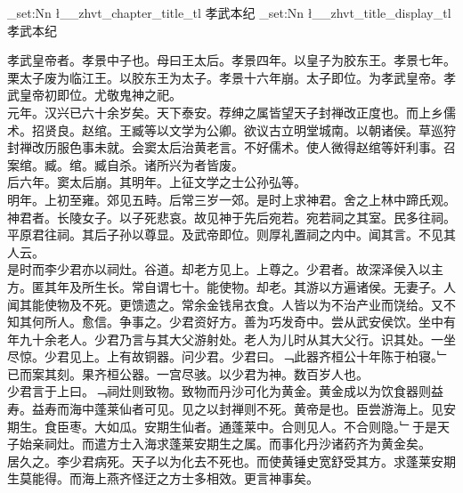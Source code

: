 \documentclass{zhvt-classic}
\begin{document}
\clearpage
\ExplSyntaxOn
\tl_set:Nn \l__zhvt_chapter_title_tl { 孝武本纪 }
\tl_set:Nn \l__zhvt_title_display_tl { 孝武本纪 }
\ExplSyntaxOff
\maketitle


\hspace*{2em}孝武皇帝者。孝景中子也。母曰王太后。孝景四年。以皇子为胶东王。孝景七年。栗太子废为临江王。以胶东王为太子。孝景十六年崩。太子即位。为孝武皇帝。孝武皇帝初即位。尤敬鬼神之祀。\\
\hspace*{2em}元年。汉兴已六十余岁矣。天下泰安。荐绅之属皆望天子封禅改正度也。而上乡儒术。招贤良。赵绾。王臧等以文学为公卿。欲议古立明堂城南。以朝诸侯。草巡狩封禅改历服色事未就。会窦太后治黄老言。不好儒术。使人微得赵绾等奸利事。召案绾。臧。绾。臧自杀。诸所兴为者皆废。\\
\hspace*{2em}后六年。窦太后崩。其明年。上征文学之士公孙弘等。\\
\hspace*{2em}明年。上初至雍。郊见五畤。后常三岁一郊。是时上求神君。舍之上林中蹄氏观。神君者。长陵女子。以子死悲哀。故见神于先后宛若。宛若祠之其室。民多往祠。平原君往祠。其后子孙以尊显。及武帝即位。则厚礼置祠之内中。闻其言。不见其人云。\\
\hspace*{2em}是时而李少君亦以祠灶。谷道。却老方见上。上尊之。少君者。故深泽侯入以主方。匿其年及所生长。常自谓七十。能使物。却老。其游以方遍诸侯。无妻子。人闻其能使物及不死。更馈遗之。常余金钱帛衣食。人皆以为不治产业而饶给。又不知其何所人。愈信。争事之。少君资好方。善为巧发奇中。尝从武安侯饮。坐中有年九十余老人。少君乃言与其大父游射处。老人为儿时从其大父行。识其处。一坐尽惊。少君见上。上有故铜器。问少君。少君曰。﹁此器齐桓公十年陈于柏寝。﹂已而案其刻。果齐桓公器。一宫尽骇。以少君为神。数百岁人也。\\
\hspace*{2em}少君言于上曰。﹁祠灶则致物。致物而丹沙可化为黄金。黄金成以为饮食器则益寿。益寿而海中蓬莱仙者可见。见之以封禅则不死。黄帝是也。臣尝游海上。见安期生。食臣枣。大如瓜。安期生仙者。通蓬莱中。合则见人。不合则隐。﹂于是天子始亲祠灶。而遣方士入海求蓬莱安期生之属。而事化丹沙诸药齐为黄金矣。\\
\hspace*{2em}居久之。李少君病死。天子以为化去不死也。而使黄锤史宽舒受其方。求蓬莱安期生莫能得。而海上燕齐怪迂之方士多相效。更言神事矣。\\
\end{document}
